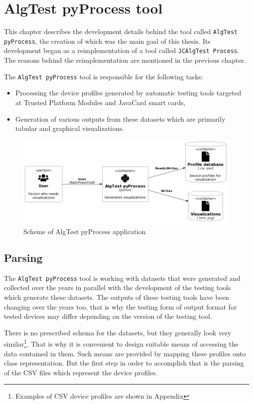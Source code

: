 \chapter{AlgTest pyProcess tool}
This chapter describes the development details behind the tool called \texttt{AlgTest pyProcess}, the creation of which was the main goal of this thesis. Its development began as a reimplementation of a tool called \texttt{JCAlgTest Process}. The reasons behind the reimplementation are mentioned in the previous chapter.

The \texttt{AlgTest pyProcess} tool is responsible for the following tasks:
\begin{itemize}
    \item Processing the device profiles generated by automatic testing tools targeted at Trusted Platform Modules and JavaCard smart cards,
    \item Generation of various outputs from these datasets which are primarily tabular and graphical visualizations.
\end{itemize}
\begin{figure}[h]
    \centering
    \includegraphics[width=\textwidth]{img/scheme.png}
    \caption{Scheme of AlgTest pyProcess application}
    \label{fig:algtest-process-scheme}
\end{figure}


\section{Parsing}
The \texttt{AlgTest pyProcess} tool is working with datasets that were generated and collected over the years in parallel with the development of the testing tools which generate these datasets. The outputs of these testing tools have been changing over the years too, that is why the testing form of output format for tested devices may differ depending on the version of the testing tool.

There is no prescribed schema for the datasets, but they generally look very similar\footnote{Examples of CSV device profiles are shown in Appendix}. That is why it is convenient to design suitable means of accessing the data contained in them. Such means are provided by mapping these profiles onto class representation. But the first step in order to accomplish that is the parsing of the CSV files which represent the device profiles. 



